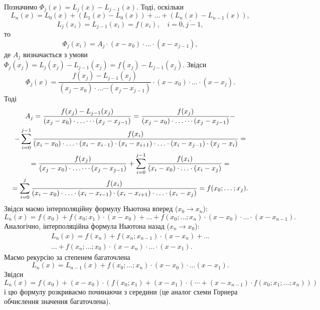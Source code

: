 Позначимо $\Phi_j(x) = L_j(x) - L_{j-1}(x)$. Тоді, оскільки
\[ L_n(x) = L_0(x) + (L_1(x) - L_0(x)) + \ldots + (L_n(x) - L_{n-1}(x)), \]
\[ L_j(x_i) = L_{j-1}(x_i) = f(x_i), \quad i = \overline{0,j-1},\]
то
\begin{equation}
    \label{eq:6.16}
    \Phi_j(x_i) = A_j \cdot (x - x_0) \cdot \ldots \cdot (x - x_{j-1}),
\end{equation}
де $A_j$ визначається з умови $\Phi_j(x_j) = L_j(x_j) - L_{j-1}(x_j) = f(x_j) - L_{j-1}(x_j)$. Звідси
\[ \Phi_j(x) = \dfrac{f(x_j)-L_{j-1}(x_j)}{(x_j-x_0)\cdot\ldots\cdots(x_j-x_{j-1})}\cdot(x-x_0)\cdot\ldots\cdot(x-x_j).\] 
Тоді
\begin{multline*}
    A_j = \dfrac{f(x_j)-L_{j-1}(x_j)}{(x_j-x_0)\cdot\ldots\cdots(x_j-x_{j-1})} = \dfrac{f(x_j)}{(x_j-x_0)\cdot\ldots\cdots(x_j-x_{j-1})} - \\
    - \displaystyle\sum\limits_{i=0}^{j-1} \dfrac{f(x_i)}{(x_i-x_0)\cdot\ldots\cdot(x_i-x_{i-1})\cdot(x_i-x_{i+1})\cdot\ldots\cdot(x_i-x_{j-1})\cdot(x_j-x_i)} = \\
    = \dfrac{f(x_j)}{(x_j-x_0)\cdot\ldots\cdots(x_j-x_{j-1})} + \displaystyle\sum\limits_{i=0}^{j-1} \dfrac{f(x_i)}{(x_i-x_0)\cdot\ldots\cdot(x_i-x_j)} =  \\
    = \displaystyle\sum\limits_{i=0}^j \dfrac{f(x_i)}{(x_i-x_0)\cdot\ldots\cdot(x_i-x_{i-1})\cdot(x_i-x_{i+1})\cdot\ldots\cdot(x_i-x_j)} = f(x_0;\ldots;x_j).
\end{multline*}
Звідси маємо інтерполяційну формулу Ньютона вперед ($x_0 \to x_n$):
\begin{equation}
    \label{eq:6.17}
    L_n(x) = f(x_0) + f(x_0;x_1) \cdot (x-x_0) + \ldots + f(x_0;\ldots;x_n) \cdot (x-x_0) \cdot \ldots \cdot (x-x_{n-1}).
\end{equation}
Аналогічно, інтерполяційна формула Ньютона назад ($x_n\to x_0$):
\begin{multline}
    \label{eq:6.18}
    L_n(x) = f(x_n) + f(x_n;x_{n-1}) \cdot (x-x_n) + \ldots \\
    \ldots + f(x_n;\ldots;x_0) \cdot (x-x_n) \cdot \ldots \cdot (x-x_1).
\end{multline}
Маємо рекурсію за степенем багаточлена 
\[ L_n(x) = L_{n-1}(x) + f(x_0;\ldots;x_n)\cdot(x-x_0)\cdot\ldots(x-x_1).\]
Звідси \[L_n(x) = f(x_0) + (x-x_0)\cdot(f(x_0;x_1)+(x-x_1)\cdot(\cdots+(x-x_{n-1})\cdot f(x_0;x_1;\ldots;x_n)))\] і цю формулу розкриваємо починаючи з середини (це аналог схеми Горнера обчислення значення багаточлена). \\

